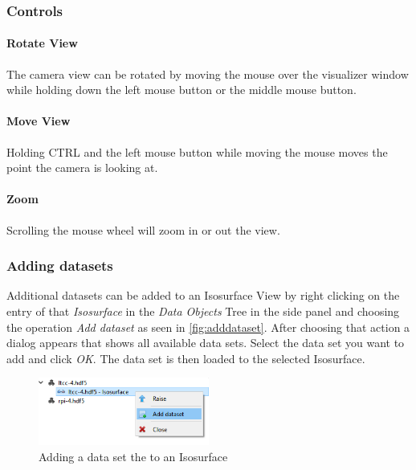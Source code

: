 \subsubsection{Controls}\label{sec:isocontrols}
\paragraph{Rotate View}\label{par:rotate_view}
The camera view can be rotated by moving the mouse over the visualizer window while
holding down the left mouse button or the middle mouse button.

\paragraph{Move View}\label{par:move_view}
Holding CTRL and the left mouse button while moving the mouse moves the point the camera is looking at.

\paragraph{Zoom}
Scrolling the mouse wheel will zoom in or out the view.

\subsubsection{Adding datasets}
Additional datasets can be added to an Isosurface View by right clicking on the entry of that \emph{Isosurface}
in the \emph{Data Objects} Tree in the side panel and choosing the operation \emph{Add dataset} as seen in \autoref{fig:adddataset}.
After choosing that action a dialog appears that shows all available data sets. Select the data set you want to add and click \emph{OK}.
The data set is then loaded to the selected Isosurface.

\begin{figure}[h!]
  \centering
  \includegraphics[width=0.5\textwidth]{img/adddataset.png}
  \caption{Adding a data set the to an Isosurface}
  \label{fig:adddataset}
\end{figure}

